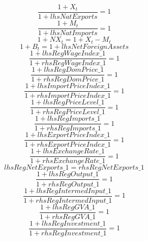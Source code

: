 \begin{dmath}
\frac{1+{X}_{t}}{1+{lhsNatExports}}=1
\end{dmath}
\begin{dmath}
\frac{1+{M}_{t}}{1+{lhsNatImports}}=1
\end{dmath}
\begin{dmath}
1+{NX}_{t}=1+{X}_{t}-{M}_{t}
\end{dmath}
\begin{dmath}
1+{B}_{t}=1+{lhsNetForeignAssets}
\end{dmath}
\begin{dmath}
\frac{1+{lhsRegWageIndex\_1}}{1+{rhsRegWageIndex\_1}}=1
\end{dmath}
\begin{dmath}
\frac{1+{lhsRegDomPrice\_1}}{1+{rhsRegDomPrice\_1}}=1
\end{dmath}
\begin{dmath}
\frac{1+{lhsImportPriceIndex\_1}}{1+{rhsImportPriceIndex\_1}}=1
\end{dmath}
\begin{dmath}
\frac{1+{lhsRegPriceLevel\_1}}{1+{rhsRegPriceLevel\_1}}=1
\end{dmath}
\begin{dmath}
\frac{1+{lhsRegImports\_1}}{1+{rhsRegImports\_1}}=1
\end{dmath}
\begin{dmath}
\frac{1+{lhsExportPriceIndex\_1}}{1+{rhsExportPriceIndex\_1}}=1
\end{dmath}
\begin{dmath}
\frac{1+{lhsExchangeRate\_1}}{1+{rhsExchangeRate\_1}}=1
\end{dmath}
\begin{dmath}
{lhsRegNetExports\_1}={rhsRegNetExports\_1}
\end{dmath}
\begin{dmath}
\frac{1+{lhsRegOutput\_1}}{1+{rhsRegOutput\_1}}=1
\end{dmath}
\begin{dmath}
\frac{1+{lhsRegIntermedInput\_1}}{1+{rhsRegIntermedInput\_1}}=1
\end{dmath}
\begin{dmath}
\frac{1+{lhsRegGVA\_1}}{1+{rhsRegGVA\_1}}=1
\end{dmath}
\begin{dmath}
\frac{1+{lhsRegInvestment\_1}}{1+{rhsRegInvestment\_1}}=1
\end{dmath}
